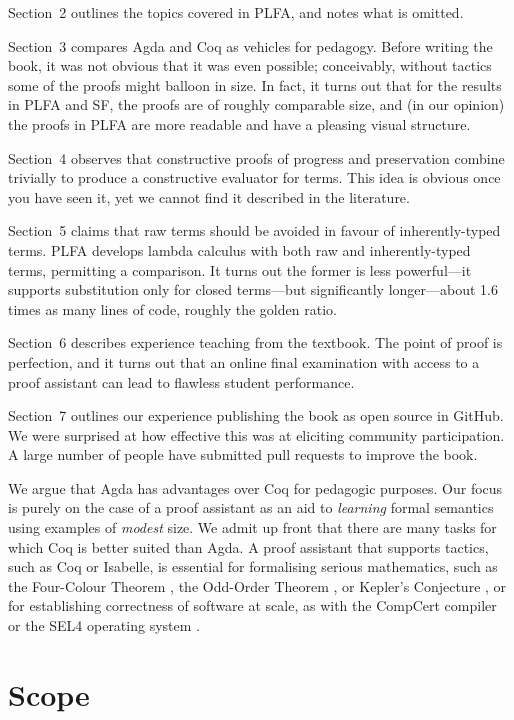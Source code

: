 \documentclass[preprint,authoryear]{elsarticle}
\begin{document}
Section~2 outlines the
topics covered in PLFA, and notes what is omitted.

Section~3 compares Agda and Coq as vehicles for pedagogy.  Before
writing the book, it was not obvious that it was even possible;
conceivably, without tactics some of the proofs might
balloon in size. In fact, it turns out that for the results in PLFA
and SF, the proofs are of roughly comparable size, and (in our opinion)
the proofs in PLFA are more readable and have a pleasing visual
structure.

Section~4 observes that constructive proofs of progress and
preservation combine trivially to produce a constructive evaluator for
terms.  This idea is obvious once you have seen it, yet we cannot
find it described in the literature.

Section~5 claims that raw terms should be avoided in favour of
inherently-typed terms.  PLFA develops lambda calculus with both raw
and inherently-typed terms, permitting a comparison.  It turns out the
former is less powerful---it supports substitution only for closed
terms---but significantly longer---about 1.6 times as many lines of code,
roughly the golden ratio.

Section~6 describes experience teaching from the textbook.  The point
of proof is perfection, and it turns out that an online final
examination with access to a proof assistant can lead to flawless
student performance.

Section~7 outlines our experience publishing the book as open source
in GitHub.  We were surprised at how effective this was at eliciting
community participation.  A large number of people have submitted pull
requests to improve the book.

We argue that Agda has advantages over Coq for
pedagogic purposes.  Our focus is purely on the case of a proof assistant
as an aid to \emph{learning} formal semantics using examples of
\emph{modest} size.  We admit up front that
there are many tasks for which Coq is better suited than Agda.
A proof assistant that supports tactics, such as Coq or Isabelle,
is essential for formalising serious mathematics,
such as the Four-Colour Theorem \citep{Gonthier-2008},
the Odd-Order Theorem \citep{Gonthier-et-al-2013},
or Kepler's Conjecture \citep{Hales-et-al-2017},
or for establishing correctness of software at scale,
as with the CompCert compiler \citep{Leroy-2009,Kastner-et-al-2017}
or the SEL4 operating system \citep{Klein-2009,O'Connor-2016}.

\section{Scope}
\end{document}
